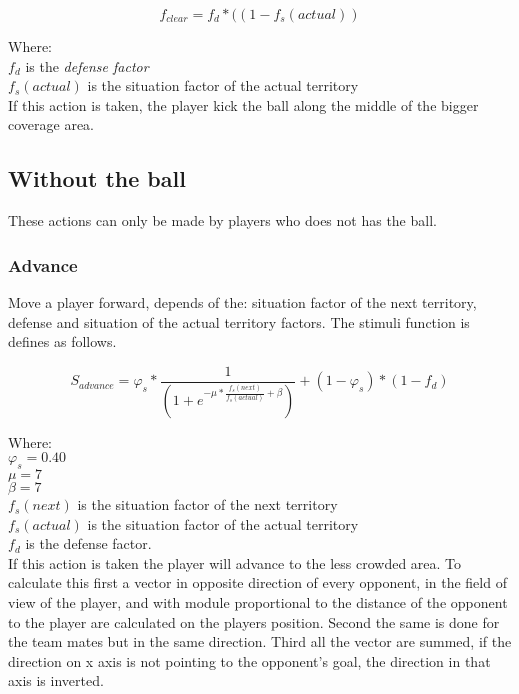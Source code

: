 \documentclass[
10pt, %
a4paper, %
oneside, %
headinclude,footinclude, %
BCOR5mm, %
]{scrartcl}
\begin{document}
 \begin{equation}
	f_{clear} = f_d * ((1 - f_s(actual))
 \end{equation}

Where:\\
$f_d$ is the \textit{defense factor} \\
$f_{s}(actual)$ is the situation factor of the actual territory \\

If this action is taken, the player kick the ball along the middle of the bigger coverage area.

\subsection{Without the ball}
These actions can only be made by players who does not has the ball.

\subsubsection{Advance}
Move a player forward, depends of the: situation factor of the next territory, defense  and situation of the actual territory factors. The stimuli function is defines as follows.

\begin{equation}
	S_{advance} = \varphi_s * \frac{1}{(1 + e^{- \mu * \frac{f_{s}(next)}{f_{s}(actual)} + \beta})} + (1 - \varphi_s) * (1  - f_d)
\end{equation}

Where:\\
$\varphi_{s} = 0.40$ \\
$\mu = 7$\\
$\beta = 7$\\
$f_{s}(next)$ is the situation factor of the next territory \\
$f_{s}(actual)$ is the situation factor of the actual territory\\
$f_{d}$ is  the defense factor.\\

If this action is taken the player will advance to the less crowded area. To calculate this first a vector in opposite direction of every opponent, in the  field of view of the player, and with module proportional to the distance of the opponent to the player are calculated on the players position. Second the same is done for the team mates but in the same direction. Third all the vector are summed, if the direction on x axis is not pointing to the opponent's goal, the direction in that axis is inverted.
\end{document}

